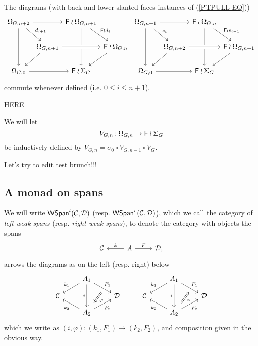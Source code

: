 \documentclass[a4paper,10pt]{article}%
\begin{document}
\begin{remark}\label{DSCOM REM}
The diagrams (with back and lower slanted faces instances of (\ref{PTPULL EQ}))
	\[
	\begin{tikzcd}[column sep = 0.1em]
		\Omega_{G,{n+2}} \ar{rr} \ar{rd}{d_{i+1}} \ar{dd}
		 & & \Fin \wr \Omega_{G,{n+1}} \ar{rd}{\Fin \wr d_i} \ar{dd} & &
		\Omega_{G,{n+1}} \ar{rr} \ar{rd}{s_{i}} \ar{dd} 
		& & \Fin \wr \Omega_{G,{n}} \ar{rd}{\Fin \wr s_{i-1}} \ar{dd} &
	\\
		& \Omega_{G,{n+1}} \ar{ld} \ar[crossing over]{rr} 
		& & \Fin \wr \Omega_{G,{n}} \ar{ld} &
		& \Omega_{G,{n+2}} \ar{ld} \ar[crossing over]{rr} 
		& & \Fin \wr \Omega_{G,{n+1}} \ar{ld}
	\\
		 \Omega_{G,0} \ar{rr} & & \Fin \wr \Sigma_G & &
		 \Omega_{G,0} \ar{rr} & & \Fin \wr \Sigma_G &
	\end{tikzcd}
	\]
commute whenever defined (i.e. $0 \leq i \leq n+1$).
\end{remark}

{\color{red} HERE}


\begin{notation}
	We will let 
\[
	V_{G,n} \colon \Omega_{G,n} \to \mathsf{F} \wr \Sigma_G
\]
be inductively defined by 
$V_{G,n} = \sigma_0 \circ V_{G,n-1} \circ V_G$.
\end{notation}

Let's try to edit test brunch!!!




\subsection{A monad on spans}

\begin{definition}
We will write 
$\mathsf{WSpan}^l(\mathcal{C},\mathcal{D})$
(resp.
$\mathsf{WSpan}^r(\mathcal{C},\mathcal{D})$),
which we call the category of  \textit{left weak spans} (resp. \textit{right weak spans}),
to denote the category with objects the spans
\[
\begin{tikzcd}
\C & A \ar{l}[swap]{k} \ar{r}{F} & \D,
\end{tikzcd}
\]
arrows the diagrams as on the left (resp. right) below \begin{equation}\label{TWISTEDARROWRIGHT EQ}
	\begin{tikzcd}[row sep=small]
	&
	A_1 \ar{dl}[swap,name=k1]{k_1} \ar{dr}[name=F11]{F_1} \ar{dd}[swap]{i} & &
	&
	A_1 \ar{dl}[swap,name=k1]{k_1} \ar{dr}[name=F1]{F_1} \ar{dd}[swap]{i} 
\\
	\C & & \D &
	\C & & \D 
\\
		& |[alias=G21]| A_2  \ar{ul}{k_2} \ar{ur}[swap]{F_2} & &
		& |[alias=G2]| A_2  \ar{ul}{k_2} \ar{ur}[swap]{F_2} &
		\arrow[Leftarrow, from=F1, to=G2,shorten >=0.25cm,shorten <=0.25cm,"\varphi"]
		\arrow[Rightarrow, from=F11, to=G21,shorten >=0.25cm,shorten <=0.25cm,"\varphi"]
	\end{tikzcd}
\end{equation}
which we write as $(i,\varphi) \colon (k_1,F_1) \to (k_2,F_2)$, and composition given in the obvious way.
\end{definition}
\end{document}
